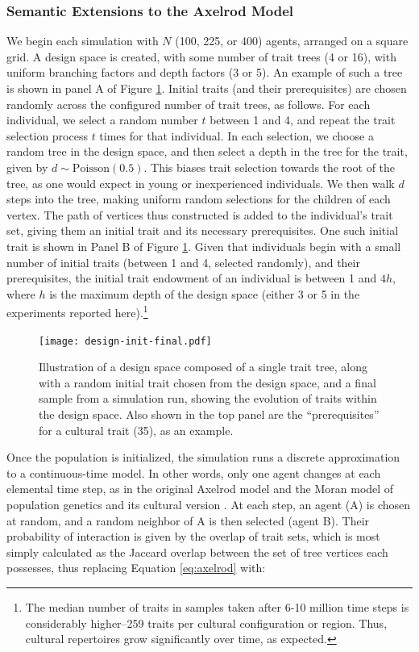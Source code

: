 \documentclass[graybox,natbib]{svmult}
\begin{document}
\subsubsection{Semantic Extensions to the Axelrod
Model}\label{semantic-extensions-to-the-axelrod-model}

We begin each simulation with $N$ (100, 225, or 400) agents, arranged on
a square grid. A design space is created, with some number of trait
trees (4 or 16), with uniform branching factors and depth factors (3 or
5). An example of such a tree is shown in panel A of Figure
\ref{img:prereq}. Initial traits (and their prerequisites) are chosen
randomly across the configured number of trait trees, as follows. For
each individual, we select a random number $t$ between 1 and 4, and
repeat the trait selection process $t$ times for that individual. In
each selection, we choose a random tree in the design space, and then
select a depth in the tree for the trait, given by
$d  \sim \textrm{Poisson}(0.5)$. This biases trait selection towards the
root of the tree, as one would expect in young or inexperienced
individuals. We then walk $d$ steps into the tree, making uniform random
selections for the children of each vertex. The path of vertices thus
constructed is added to the individual's trait set, giving them an
initial trait and its necessary prerequisites. One such initial trait is
shown in Panel B of Figure \ref{img:prereq}. Given that individuals
begin with a small number of initial traits (between 1 and 4, selected
randomly), and their prerequisites, the initial trait endowment of an
individual is between 1 and $4h$, where $h$ is the maximum depth of the
design space (either 3 or 5 in the experiments reported here).\footnote{The
  median number of traits in samples taken after 6-10 million time steps
  is considerably higher--259 traits per cultural configuration or
  region. Thus, cultural repertoires grow significantly over time, as
  expected.}

\begin{figure}[htbp] 
\centering 
\texttt{[image: design-init-final.pdf]} 
\caption{Illustration of a design space composed of a single trait tree, along with a random initial trait chosen from the design space, and a final sample from a simulation run, showing the evolution of traits within the design space.  Also shown in the top panel are the ``prerequisites'' for a cultural trait (35), as an example.} 
\label{img:prereq} 
\end{figure}

Once the population is initialized, the simulation runs a discrete
approximation to a continuous-time model. In other words, only one agent
changes at each elemental time step, as in the original Axelrod model
and the Moran model of population genetics and its cultural version
\citep{aoki2011rates, moran1962statistical, moran1958random}. At each
step, an agent (A) is chosen at random, and a random neighbor of A is
then selected (agent B). Their probability of interaction is given by
the overlap of trait sets, which is most simply calculated as the
Jaccard overlap between the set of tree vertices each possesses, thus
replacing Equation \ref{eq:axelrod} with:
\end{document}
